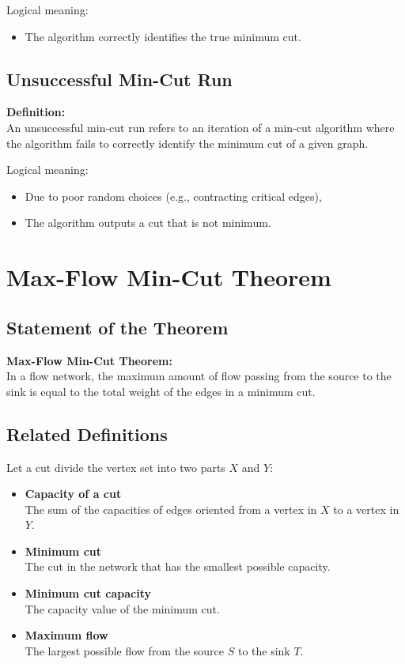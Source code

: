 \documentclass[12pt]{article}
\begin{document}
Logical meaning:
\begin{itemize}
    \item The algorithm correctly identifies the true minimum cut.
\end{itemize}

\subsection{Unsuccessful Min-Cut Run}

\textbf{Definition:} \\
An unsuccessful min-cut run refers to an iteration of a min-cut algorithm where the algorithm fails to correctly identify the minimum cut of a given graph.

Logical meaning:
\begin{itemize}
    \item Due to poor random choices (e.g., contracting critical edges),
    \item The algorithm outputs a cut that is not minimum.
\end{itemize}

\section{Max-Flow Min-Cut Theorem}

\subsection{Statement of the Theorem}

\textbf{Max-Flow Min-Cut Theorem:} \\
In a flow network, the maximum amount of flow passing from the source to the sink is equal to the total weight of the edges in a minimum cut.

\subsection{Related Definitions}

Let a cut divide the vertex set into two parts $X$ and $Y$:

\begin{itemize}
    \item \textbf{Capacity of a cut} \\
    The sum of the capacities of edges oriented from a vertex in $X$ to a vertex in $Y$.
    
    \item \textbf{Minimum cut} \\
    The cut in the network that has the smallest possible capacity.
    
    \item \textbf{Minimum cut capacity} \\
    The capacity value of the minimum cut.
    
    \item \textbf{Maximum flow} \\
    The largest possible flow from the source $S$ to the sink $T$.
\end{itemize}
\end{document}
